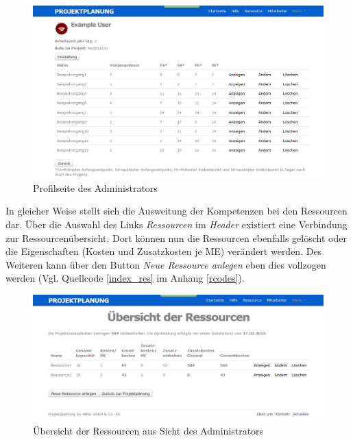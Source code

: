 \documentclass[a4paper,12pt,parskip,bibtotoc,liststotoc]{article}
\begin{document}
\begin{figure}[h!]
  \begin{center}
    \includegraphics[width=120mm]{Bilder/Profilseite_Admin.png}
    \caption{Profilseite des Administrators}  \label{ProAd}
  \end{center}
\end{figure}       

In gleicher Weise stellt sich die Ausweitung der Kompetenzen bei den Ressourcen dar. Über die Auswahl des Links \textit{Ressourcen} im \textit{Header} existiert eine Verbindung zur Ressourcenübersicht. Dort können nun die Ressourcen ebenfalls gelöscht oder die Eigenschaften (Kosten und Zusatzkosten je ME) verändert werden. Des Weiteren kann über den Button \textit{Neue Ressource anlegen} eben dies vollzogen werden (Vgl. Quellcode \ref{index_res} im Anhang \ref{rcodes}).\\      

\begin{figure}[h!]
  \begin{center}
    \includegraphics[width=120mm]{Bilder/Ressourcen_Admin.png}
    \caption{Übersicht der Ressourcen aus Sicht des Administrators}  \label{ResAd}
  \end{center}
\end{figure}     
  
\end{document}
